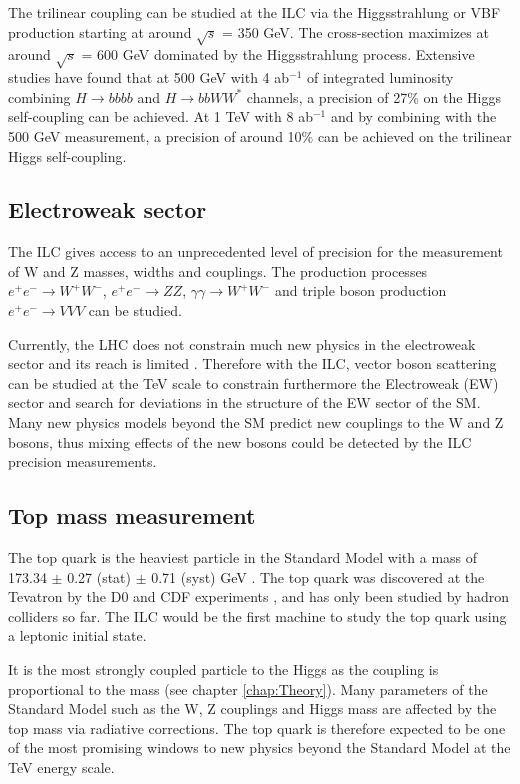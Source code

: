 The trilinear coupling can be studied at the ILC via the Higgsstrahlung or VBF production starting at around $\sqrt{s}$ = 350 GeV. The cross-section maximizes at around $\sqrt{s}$ = 600 GeV dominated by the Higgsstrahlung process. Extensive studies \cite{Duerig:2016dvi, Tian:2013qmi} have found that at 500 GeV with 4 ab$^{-1}$ of integrated luminosity combining $H \rightarrow bbbb$ and $H \rightarrow bbWW^*$ channels, a precision of 27\% on the Higgs self-coupling can be achieved. At 1 TeV with 8 ab$^{-1}$ and by combining with the 500 GeV measurement, a precision of around 10\% can be achieved on the trilinear Higgs self-coupling.

\subsection{Electroweak sector}

The ILC gives access to an unprecedented level of precision for the measurement of W and Z masses, widths and couplings. The production processes $e^+e^- \rightarrow W^+W^-$, $e^+e^- \rightarrow ZZ$, $\gamma\gamma \rightarrow W^+W^-$ and triple boson production $e^+e^- \rightarrow VVV$ can be studied.

Currently, the LHC does not constrain much new physics in the electroweak sector and its reach is limited \cite{Alboteanu:2008my}. Therefore with the ILC, vector boson scattering can be studied at the TeV scale to constrain furthermore the Electroweak (EW) sector and search for deviations in the structure of the EW sector of the SM. Many new physics models beyond the SM predict new couplings to the W and Z bosons, thus mixing effects of the new bosons could be detected by the ILC precision measurements.

\subsection{Top mass measurement}

The top quark is the heaviest particle in the Standard Model with a mass of 173.34 $\pm$ 0.27 (stat) $\pm$ 0.71 (syst) GeV \cite{ATLAS:2014wva}. The top quark was discovered at the Tevatron by the D0 and CDF experiments \cite{Abe:1995hr, D0:1995jca}, and has only been studied by hadron colliders so far. The ILC would be the first machine to study the top quark using a leptonic initial state.

It is the most strongly coupled particle to the Higgs as the coupling is proportional to the mass (see chapter \ref{chap:Theory}). Many parameters of the Standard Model such as the W, Z couplings and Higgs mass are affected by the top mass via radiative corrections. The top quark is therefore expected to be one of the most promising windows to new physics beyond the Standard Model at the TeV energy scale.

